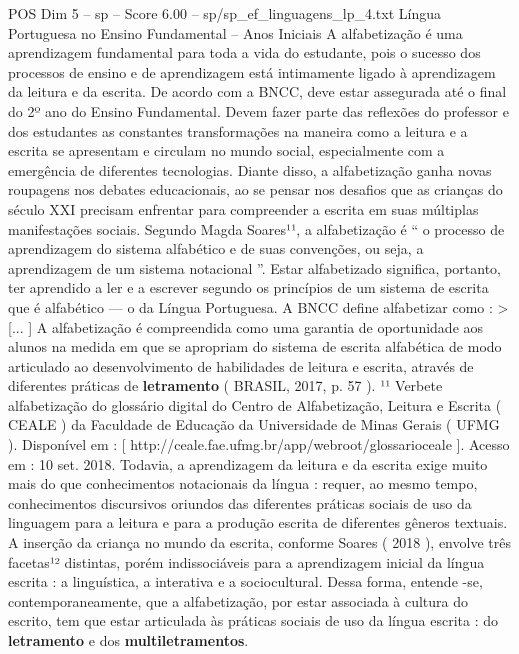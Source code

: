 \begin{textsample}{POS Dim 5 – sp – Score 6.00 – sp/sp\_ef\_linguagens\_lp\_4.txt}  \label{ex:f5_pos_074}
Língua Portuguesa no Ensino Fundamental – Anos Iniciais A alfabetização é uma aprendizagem fundamental para toda a vida do estudante, pois o sucesso dos processos de ensino e de aprendizagem está intimamente ligado à aprendizagem da leitura e da escrita.
De acordo com a BNCC, deve estar assegurada até o final do 2º ano do Ensino Fundamental.
Devem fazer parte das reflexões do professor e dos estudantes as constantes transformações na maneira como a leitura e a escrita se apresentam e circulam no mundo social, especialmente com a emergência de diferentes tecnologias.
Diante disso, a alfabetização ganha novas roupagens nos debates educacionais, ao se pensar nos desafios que as crianças do século XXI precisam enfrentar para compreender a escrita em suas múltiplas manifestações sociais.
Segundo Magda Soares¹¹, a alfabetização é “ o processo de aprendizagem do sistema alfabético e de suas convenções, ou seja, a aprendizagem de um sistema notacional ”.
Estar alfabetizado significa, portanto, ter aprendido a ler e a escrever segundo os princípios de um sistema de escrita que é alfabético — o da Língua Portuguesa.
A BNCC define alfabetizar como : > [... ] A alfabetização é compreendida como uma garantia de oportunidade aos alunos na medida em que se apropriam do sistema de escrita alfabética de modo articulado ao desenvolvimento de habilidades de leitura e escrita, através de diferentes práticas de \textbf{letramento} ( BRASIL, 2017, p. 57 ). ¹¹ Verbete alfabetização do glossário digital do Centro de Alfabetização, Leitura e Escrita ( CEALE ) da Faculdade de Educação da Universidade de Minas Gerais ( UFMG ).
Disponível em : [ http://ceale.fae.ufmg.br/app/webroot/glossarioceale ].
Acesso em : 10 set. 2018.
Todavia, a aprendizagem da leitura e da escrita exige muito mais do que conhecimentos notacionais da língua : requer, ao mesmo tempo, conhecimentos discursivos oriundos das diferentes práticas sociais de uso da linguagem para a leitura e para a produção escrita de diferentes gêneros textuais.
A inserção da criança no mundo da escrita, conforme Soares ( 2018 ), envolve três facetas¹² distintas, porém indissociáveis para a aprendizagem inicial da língua escrita : a linguística, a interativa e a sociocultural.
Dessa forma, entende -se, contemporaneamente, que a alfabetização, por estar associada à cultura do escrito, tem que estar articulada às práticas sociais de uso da língua escrita : do \textbf{letramento} e dos \textbf{multiletramentos}.

\end{textsample}
